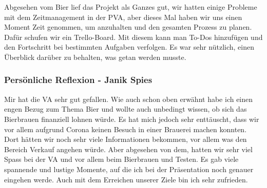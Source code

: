 Abgesehen vom Bier lief das Projekt als Ganzes gut, wir hatten einige Probleme mit dem Zeitmanagement in der PVA, aber dieses Mal haben wir uns einen Moment Zeit genommen, um anzuhalten und den gesamten Prozess zu planen. Dafür schufen wir ein Trello-Board. Mit diesem kann man To-Dos hinzufügen und den Fortschritt bei bestimmten Aufgaben verfolgen. Es war sehr nützlich, einen Überblick darüber zu behalten, was getan werden musste.
\newpage
\subsubsection{Persönliche Reflexion - Janik Spies}
Mir hat die VA sehr gut gefallen. Wie auch schon oben erwähnt habe ich einen engen Bezug zum Thema Bier und wollte auch unbedingt wissen, ob sich das Bierbrauen finanziell lohnen würde. Es hat mich jedoch sehr enttäuscht, dass wir vor allem aufgrund Corona keinen Besuch in einer Brauerei machen konnten. Dort hätten wir noch sehr viele Informationen bekommen, vor allem was den Bereich Verkauf angehen würde. Aber abgesehen von dem, hatten wir sehr viel Spass bei der VA und vor allem beim Bierbrauen und Testen. Es gab viele spannende und lustige Momente, auf die ich bei der Präsentation noch genauer eingehen werde. Auch mit dem Erreichen unserer Ziele bin ich sehr zufrieden.
